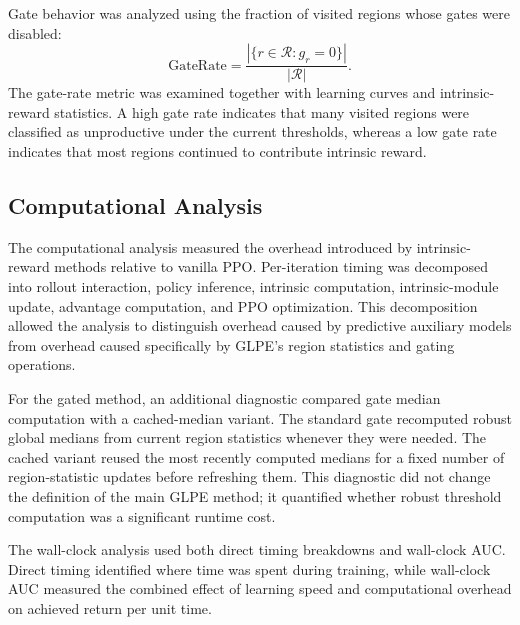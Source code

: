 Gate behavior was analyzed using the fraction of visited regions whose gates were disabled:
\begin{equation}
    \mathrm{GateRate}
    = \frac{\left|\{r\in\mathcal{R}:g_r=0\}\right|}{|\mathcal{R}|}.
\end{equation}
The gate-rate metric was examined together with learning curves and intrinsic-reward statistics.
A high gate rate indicates that many visited regions were classified as unproductive under the current thresholds, whereas a low gate rate indicates that most regions continued to contribute intrinsic reward.

\subsection{Computational Analysis}
\label{subsec:methodology_computational_analysis}

The computational analysis measured the overhead introduced by intrinsic-reward methods relative to vanilla PPO.
Per-iteration timing was decomposed into rollout interaction, policy inference, intrinsic computation, intrinsic-module update, advantage computation, and PPO optimization.
This decomposition allowed the analysis to distinguish overhead caused by predictive auxiliary models from overhead caused specifically by GLPE's region statistics and gating operations.

For the gated method, an additional diagnostic compared gate median computation with a cached-median variant.
The standard gate recomputed robust global medians from current region statistics whenever they were needed.
The cached variant reused the most recently computed medians for a fixed number of region-statistic updates before refreshing them.
This diagnostic did not change the definition of the main GLPE method; it quantified whether robust threshold computation was a significant runtime cost.

The wall-clock analysis used both direct timing breakdowns and wall-clock AUC.
Direct timing identified where time was spent during training, while wall-clock AUC measured the combined effect of learning speed and computational overhead on achieved return per unit time.